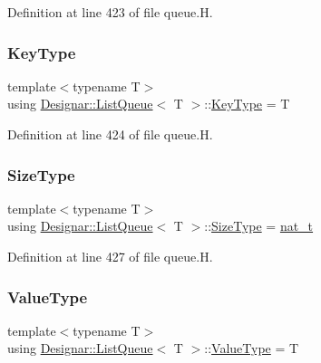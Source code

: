 Definition at line 423 of file queue.\+H.

\mbox{\label{class_designar_1_1_list_queue_abb867bba1fa9e40a4bbc27160e5148c5}} 
\subsubsection{\texorpdfstring{Key\+Type}{KeyType}}
{\footnotesize\ttfamily template$<$typename T$>$ \\
using \hyperlink{class_designar_1_1_list_queue}{Designar\+::\+List\+Queue}$<$ T $>$\+::\hyperlink{class_designar_1_1_s_l_list_a0f9ac3eaee2d1a9e6091aaaac825ccb2}{Key\+Type} =  T}



Definition at line 424 of file queue.\+H.

\mbox{\label{class_designar_1_1_list_queue_a506b74cc71e3d3ad8767ad393b4704b6}} 
\subsubsection{\texorpdfstring{Size\+Type}{SizeType}}
{\footnotesize\ttfamily template$<$typename T$>$ \\
using \hyperlink{class_designar_1_1_list_queue}{Designar\+::\+List\+Queue}$<$ T $>$\+::\hyperlink{class_designar_1_1_s_l_list_a253792b5e9c19ea61fb49e5e83f6159b}{Size\+Type} =  \hyperlink{namespace_designar_aa72662848b9f4815e7bf31a7cf3e33d1}{nat\+\_\+t}}



Definition at line 427 of file queue.\+H.

\mbox{\label{class_designar_1_1_list_queue_aa5dc35fd7e235c69f4473a96eaae2de3}} 
\subsubsection{\texorpdfstring{Value\+Type}{ValueType}}
{\footnotesize\ttfamily template$<$typename T$>$ \\
using \hyperlink{class_designar_1_1_list_queue}{Designar\+::\+List\+Queue}$<$ T $>$\+::\hyperlink{class_designar_1_1_s_l_list_a22813e78b0dea3a55f47d5f476fd99a1}{Value\+Type} =  T}



